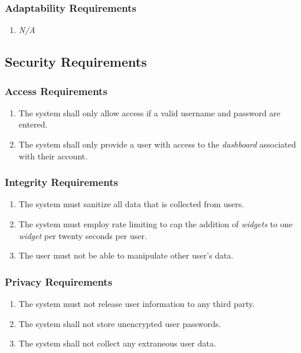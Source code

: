 \documentclass{article}
\begin{document}
	\subsubsection{Adaptability Requirements}
	\label{ssub:adaptability_requirements}
	\begin{enumerate}[{MS}1. ]
		\item \emph{N/A}
	\end{enumerate}
	
	\subsection{Security Requirements}
	\label{sub:security_requirements}
	
	\subsubsection{Access Requirements}
	\label{ssub:access_requirements}
	\begin{enumerate}[{SR}1. ]
		\item The system shall only allow access if a valid username and password are entered.
		\item The system shall only provide a user with access to the \textit{dashboard} associated with their account.
	\end{enumerate}
	
	\subsubsection{Integrity Requirements}
	\label{ssub:integrity_requirements}
	\begin{enumerate}[{SR}1. ]
		\item The system must sanitize all data that is collected from users.
		\item The system must employ rate limiting to cap the addition of \textit{widgets} to one \textit{widget} per twenty seconds per user.
		\item The user must not be able to manipulate other user's data.
	\end{enumerate}
	
	\subsubsection{Privacy Requirements}
	\label{ssub:privacy_requirements}
	\begin{enumerate}[{SR}1. ]
		\item The system must not release user information to any third party.
		\item The system shall not store unencrypted user passwords.
		\item The system shall not collect any extraneous user data.
	\end{enumerate}
	
\end{document}

